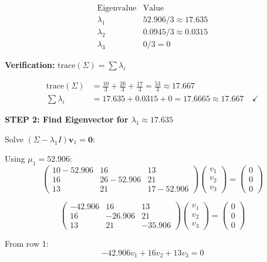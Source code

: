\documentclass[12pt]{article}
\begin{document}
\begin{solution}
\[
\boxed{\begin{array}{c|c}
\text{Eigenvalue} & \text{Value} \\
\hline
\lambda_1 & 52.906/3 \approx 17.635 \\
\lambda_2 & 0.0945/3 \approx 0.0315 \\
\lambda_3 & 0/3 = 0
\end{array}}
\]

\textbf{Verification:} $\text{trace}(\Sigma) = \sum \lambda_i$

\begin{align*}
\text{trace}(\Sigma) &= \frac{10}{3} + \frac{26}{3} + \frac{17}{3} = \frac{53}{3} \approx 17.667 \\
\sum \lambda_i &= 17.635 + 0.0315 + 0 = 17.6665 \approx 17.667 \quad \checkmark
\end{align*}

\textbf{STEP 2: Find Eigenvector for $\lambda_1 \approx 17.635$}

Solve $(\Sigma - \lambda_1 I)\mathbf{v}_1 = \mathbf{0}$:

Using $\mu_1 = 52.906$:
\[
\begin{pmatrix}
10 - 52.906 & 16 & 13 \\
16 & 26 - 52.906 & 21 \\
13 & 21 & 17 - 52.906
\end{pmatrix}\begin{pmatrix}v_1 \\ v_2 \\ v_3\end{pmatrix} = \begin{pmatrix}0 \\ 0 \\ 0\end{pmatrix}
\]

\[
\begin{pmatrix}
-42.906 & 16 & 13 \\
16 & -26.906 & 21 \\
13 & 21 & -35.906
\end{pmatrix}\begin{pmatrix}v_1 \\ v_2 \\ v_3\end{pmatrix} = \begin{pmatrix}0 \\ 0 \\ 0\end{pmatrix}
\]

From row 1:
\[
-42.906 v_1 + 16 v_2 + 13 v_3 = 0
\]


\end{solution}
\end{document}
